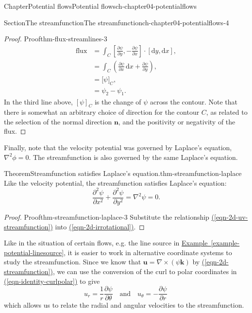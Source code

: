 \documentclass[oneside,10pt,]{book}
\newcommand{\xreffont}{\relax}
\numberwithin{equation}{section}
\newcommand{\de}{\mathrm{d}}
\newcommand{\pd}[2]{\frac{\partial#1}{\partial#2}}
\newcommand{\bn}{\boldsymbol{n}}
\newcommand{\bu}{\boldsymbol{u}}
\newcommand{\bk}{\boldsymbol{k}}
\newcommand{\amp}{&}
\begin{document}
\begin{chapterptx}{Chapter}{Potential flows}{}{Potential flows}{}{}{ch-chapter04-potentialflows}
\begin{sectionptx}{Section}{The streamfunction}{}{The streamfunction}{}{}{ch-chapter04-potentialflows-4}
\begin{introduction}{}
\begin{proof}{Proof}{}{thm-flux-streamlines-3}
\begin{align*}
\textrm{flux} \amp= \int_C \left[\pd{\psi}{y}, -\pd{\psi}{x}\right] \cdot [\de{y}, \de{x}], \\
\amp= \int_C \left(\pd{\psi}{x} \, \de{x} + \pd{\psi}{y} \right), \\
\amp= \bigl[ \psi \bigr]_C, \\
\amp= \psi_2 - \psi_1. 
\end{align*}
In the third line above, \([\psi]_C\) is the change of \(\psi\) across the contour. Note that there is somewhat an arbitrary choice of direction for the contour \(C\), as related to the selection of the normal direction \(\bn\), and the positivity or negativity of the flux.%
\end{proof}
Finally, note that the velocity potential was governed by Laplace's equation, \(\nabla^2 \phi = 0\). The streamfunction is also governed by the same Laplace's equation.%
\begin{theorem}{Theorem}{Streamfunction satisfies Laplace's equation.}{}{thm-streamfunction-laplace}%
Like the velocity potential, the streamfunction satisfies Laplace's equation:%
\begin{equation}
\pd{^2 \psi}{x^2} + \pd{^2 \psi}{y^2} = \nabla^2 \psi = 0.\label{eqn-2d-streamfunction-laplace}
\end{equation}
%
\end{theorem}
\begin{proof}{Proof}{}{thm-streamfunction-laplace-3}
Substitute the relationship \hyperref[eqn-2d-uv-streamfunction]{({\xreffont\ref{eqn-2d-uv-streamfunction}})} into \hyperref[eqn-2d-irrotational]{({\xreffont\ref{eqn-2d-irrotational}})}.%
\end{proof}
Like in the situation of certain flows, e.g. the line source in \hyperref[example-potential-linesource]{Example~{\xreffont\ref{example-potential-linesource}}}, it is easier to work in alternative coordinate systems to study the streamfunction. Since we know that \(\bu = \nabla \times (\psi \bk)\) by \hyperref[eqn-2d-streamfunction]{({\xreffont\ref{eqn-2d-streamfunction}})}, we can use the conversion of the curl to polar coordinates in \hyperref[eqn-identity-curlpolar]{({\xreffont\ref{eqn-identity-curlpolar}})} to give%
\begin{equation}
u_r = \frac{1}{r} \pd{\psi}{\theta} \quad \textrm{and} \quad u_{\theta} = -\pd{\psi}{r}\,\label{eqn-streamfunction-polar}
\end{equation}
which allows us to relate the radial and angular velocities to the streamfunction.%
\end{introduction}%

\end{sectionptx}
\end{chapterptx}
\end{document}
